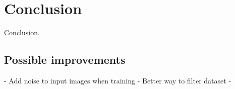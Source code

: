 \chapter{Conclusion}
Conclusion.

\section{Possible improvements}

- Add noise to input images when training 
- Better way to filter dataset
- 
